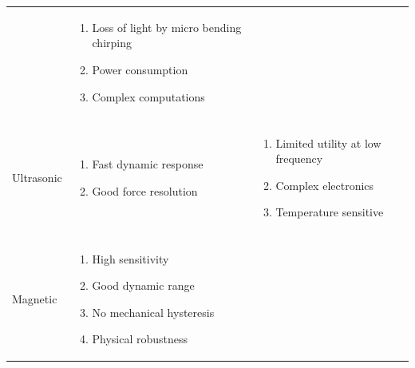 \documentclass[english]{article}
\begin{document}
\begin{table}
\begin{center}
\begin{tabular}{ l l l }
  &

\begin{minipage}{2.5in}									
    \begin{enumerate}
   \item Loss of light by micro bending chirping
   \item Power consumption
   \item Complex computations
   \end{enumerate}
 \end{minipage} 
 
 \\\\\hline
 
 	   Ultrasonic		
 	   
 	   &
 	   
 	   		 \begin{minipage}{2.5in}									
    \begin{enumerate}
   \item Fast dynamic response
   \item Good force resolution
   \end{enumerate}
 \end{minipage}  
 
 &
 
\begin{minipage}{2.5in}									
    \begin{enumerate}
   \item Limited utility at low frequency
   \item Complex electronics
   \item Temperature sensitive
   \end{enumerate}
 \end{minipage} 
 
 \\\\\hline
 
 	   Magnetic	
 	   	
 	   &
 	   
 	   		 \begin{minipage}{2.5in}									
    \begin{enumerate}
   \item High sensitivity
   \item Good dynamic range
   \item No mechanical hysteresis
   \item Physical robustness
   \end{enumerate}
 \end{minipage}  
 

\end{tabular}
\end{center}
\end{table}
\end{document}
